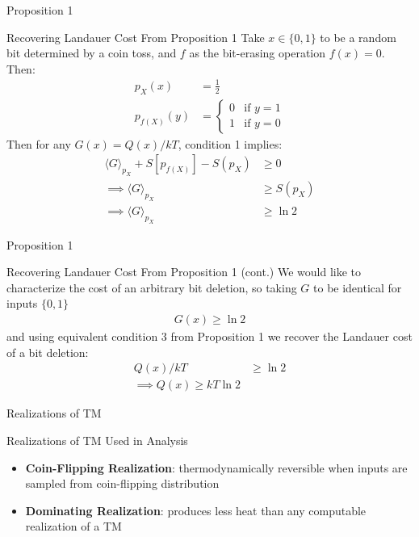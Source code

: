 
\begin{frame}{Proposition 1}
\begin{block}{Recovering Landauer Cost From Proposition 1}
{\small
Take $x\in\{0,1\}$ to be a random bit determined by a coin toss, and $f$ as the bit-erasing operation $f(x) = 0$. Then:
\begin{align*}
    p_X(x) &= \frac{1}{2}\\
    p_{f(X)}(y) &= \begin{cases} 0 &\text{if } y=1\\ 1 &\text{if }y=0\end{cases}
\end{align*}
Then for any $G(x) = Q(x)/kT$, condition 1 implies:
\begin{align*}
    \langle G \rangle_{p_X} + S[p_{f(X)}] - S(p_X) &\ge 0\\
    \implies \langle G\rangle_{p_X} &\ge S(p_X)\\
    \implies \langle G\rangle_{p_X} &\ge \ln 2
\end{align*}
}
\end{block}
\end{frame}

\begin{frame}{Proposition 1}
\begin{block}{Recovering Landauer Cost From Proposition 1 (cont.)}
We would like to characterize the cost of an arbitrary bit deletion, so taking $G$ to be identical for inputs $\{0,1\}$
\begin{align*}
    G(x) \ge \ln 2
\end{align*}
and using equivalent condition 3 from Proposition 1 we recover the Landauer cost of a bit deletion:
\begin{align*}
    Q(x)/kT &\ge \ln 2\\
    \implies Q(x) \ge kT \ln 2
\end{align*}
\end{block}
\end{frame}


\begin{frame}{Realizations of TM}
\begin{block}{Realizations of TM Used in Analysis}
    \begin{itemize}
        \item \textbf{Coin-Flipping Realization}: thermodynamically reversible when inputs are sampled from coin-flipping distribution
        \item \textbf{Dominating Realization}: produces less heat than any computable realization of a TM
    \end{itemize}
\end{block}
\end{frame}




